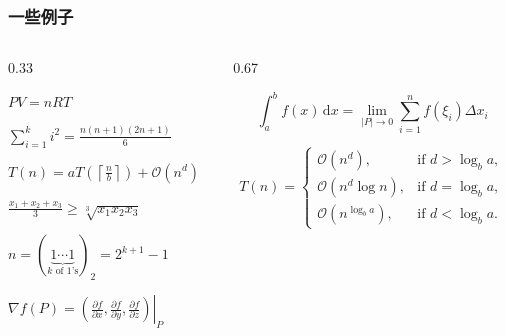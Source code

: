 \begin{frame}
  \frametitle{一些例子}
  \begin{columns}
    \begin{column}{0.33\textwidth}
      \begin{exampleblock}{}
        $PV=nRT$
      \end{exampleblock}
      \begin{exampleblock}{}
        $\sum_{i=1}^ki^2=\frac{n(n+1)(2n+1)}{6}$
      \end{exampleblock}
      \begin{exampleblock}{}
        $T(n) = aT\left(\left\lceil\frac{n}{b}\right\rceil\right) + \mathcal{O}(n^d)$
      \end{exampleblock}
      \begin{exampleblock}{}
        $\frac{x_{1}+x_{2}+x_{3}}{3}\geq \sqrt[3]{x_{1}x_{2}x_{3}}$
      \end{exampleblock}
      \begin{exampleblock}{}
        $n=(\underbrace{1\cdots 1}_{k\text{ of 1's}})_2=2^{k+1}-1$
      \end{exampleblock}
      \begin{exampleblock}{}
        $\nabla f (P)= \left.\left(\frac{\partial f}{\partial x},\frac{\partial f}{\partial y},\frac{\partial f}{\partial z}\right)\right|_{P}$
      \end{exampleblock}
    \end{column}
    \begin{column}{0.67\textwidth}
      \begin{exampleblock}{}
        \begin{equation*}
          \int_{a}^b f(x)\,\mathrm{d}x=\lim_{|P|\rightarrow 0}\sum_{i=1}^n f(\xi_i)\Delta x_i
        \end{equation*}
      \end{exampleblock}
      \begin{exampleblock}{}
        \begin{equation}
          T(n) = \begin{cases}
            \mathcal{O}(n^d),&\textrm{if } d>\log_b a, \\
            \mathcal{O}(n^d\log n), &\textrm{if } d=\log_b a,\\
            \mathcal{O}(n^{\log_b a}), &\textrm{if } d<\log_b a.
          \end{cases}
        \end{equation}

\end{exampleblock}
\end{column}
\end{columns}
\end{frame}
